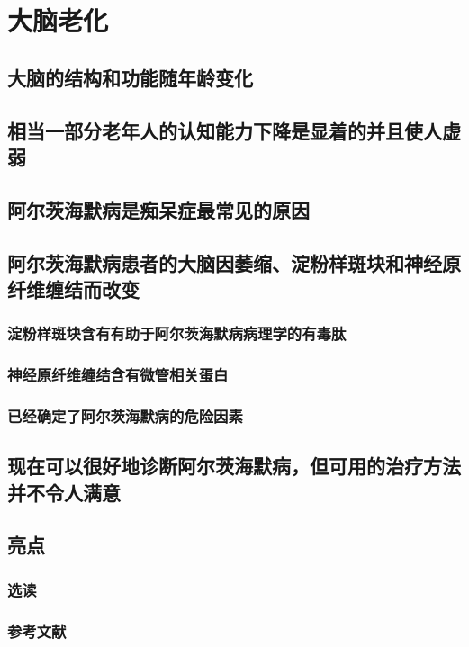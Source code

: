 \chapter{大脑老化}

\section{大脑的结构和功能随年龄变化}

\section{相当一部分老年人的认知能力下降是显着的并且使人虚弱}

\section{阿尔茨海默病是痴呆症最常见的原因}

\section{阿尔茨海默病患者的大脑因萎缩、淀粉样斑块和神经原纤维缠结而改变}
\subsection{淀粉样斑块含有有助于阿尔茨海默病病理学的有毒肽}
\subsection{神经原纤维缠结含有微管相关蛋白}
\subsection{已经确定了阿尔茨海默病的危险因素}

\section{现在可以很好地诊断阿尔茨海默病，但可用的治疗方法并不令人满意}

\section{亮点}
\subsection{选读}
\subsection{参考文献}